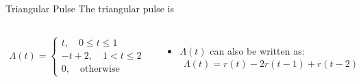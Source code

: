\documentclass[aspectratio=169,xcolor=dvipsnames,svgnames,x11names,fleqn]{beamer}
\begin{document}
\begin{frame}{Triangular Pulse}
The triangular pulse is 
\begin{columns}
 \begin{equation*}
    \begin{aligned}
        \Lambda(t) = \begin{cases}
            t ,\quad 0 \leq t \leq 1\\
            -t + 2, \quad 1 < t \leq 2\\
            0,\quad \textrm{otherwise}
        \end{cases}
    \end{aligned}
\end{equation*}
    \begin{itemize}
        \item $ \Lambda(t)$ can also be written as:
        \begin{equation*}
            \begin{aligned}
              \Lambda(t) =   r(t) - 2r(t-1) + r(t-2)
            \end{aligned}
        \end{equation*}
    \end{itemize}
     \includegraphics[width=0.85\linewidth,trim=0 0 0 0cm,clip]{figures/triangular_pulse.png}
    \end{columns}
\end{frame}
\end{document}
